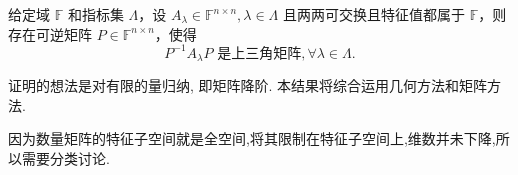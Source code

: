 \documentclass[../../main.tex]{subfiles}
\begin{document}
\begin{proposition}[一族两两可交换的一般域上的矩阵可同时上三角化]\label{proposition:一族两两可交换的一般域上的矩阵可同时上三角化}
给定域 $\mathbb{F}$ 和指标集 $\Lambda$，设 $A_\lambda \in \mathbb{F}^{n \times n}, \lambda \in \Lambda$ 且两两可交换且特征值都属于 $\mathbb{F}$，则存在可逆矩阵 $P \in \mathbb{F}^{n \times n}$，使得
\[P^{-1}A_\lambda P \text{ 是上三角矩阵}, \forall \lambda \in \Lambda.\]
\end{proposition}
\begin{note}
证明的想法是对有限的量归纳, 即矩阵降阶. 本结果将综合运用几何方法和矩阵方法.
\end{note}
\begin{remark}
因为数量矩阵的特征子空间就是全空间,将其限制在特征子空间上,维数并未下降,所以需要分类讨论.
\end{remark}
\end{document}

